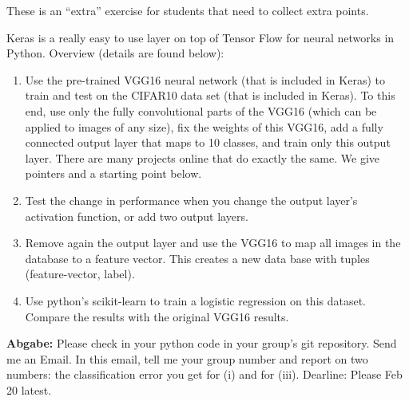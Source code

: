 

\renewcommand{\course}{Artificial Intelligence}
\renewcommand{\coursepicture}{course_ai}
\renewcommand{\coursedate}{Winter 2019}
\renewcommand{\exnum}{Exercise 7}

\exercises
{}
\exercisestitle

These is an ``extra'' exercise for students that need to collect extra points.



Keras is a really easy to use layer on top of Tensor Flow for neural networks in Python. Overview (details are found below):
\begin{enumerate}
\item Use the pre-trained VGG16 neural network (that is included in Keras) to train and test on the CIFAR10 data set (that is included in Keras). To this end, use only the fully convolutional parts of the VGG16 (which can be applied to images of any size), fix the weights of this VGG16, add a fully connected output layer that maps to 10 classes, and train only this output layer.
There are many projects online that do exactly the same. We give
pointers and a starting point below.
\item Test the change in performance when you change the output layer's activation function, or add two output layers.
\item Remove again the output layer and use the VGG16 to map all images in the database to a feature vector. This creates a new data base with tuples (feature-vector, label).
\item Use python's scikit-learn to train a logistic regression on this dataset. Compare the results with the original VGG16 results.
\end{enumerate}

\textbf{Abgabe:} Please check in your python code in your group's git repository. Send me an Email. In this email, tell me your group number and report on two numbers: the classification error you get for (i) and for (iii). Dearline: Please Feb 20 latest.

